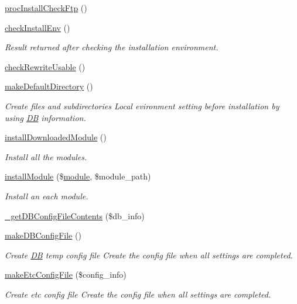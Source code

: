 \begin{DoxyCompactItemize}
\hyperlink{classinstallController_aebbed72d5e11663013b1c1cbe281fcfe}{proc\+Install\+Check\+Ftp} ()
\item 
\hyperlink{classinstallController_a6cd48bffa15badc616c0b860c59d410e}{check\+Install\+Env} ()
\begin{DoxyCompactList}\small\item\em Result returned after checking the installation environment. \end{DoxyCompactList}\item 
\hyperlink{classinstallController_ae621886c36c43926d81f6beb56cfde25}{check\+Rewrite\+Usable} ()
\item 
\hyperlink{classinstallController_a5503f7ef0615cbd6b11a6ef4ae13c2c9}{make\+Default\+Directory} ()
\begin{DoxyCompactList}\small\item\em Create files and subdirectories Local evironment setting before installation by using \hyperlink{classDB}{D\+B} information. \end{DoxyCompactList}\item 
\hyperlink{classinstallController_ad7919cd4745794ee4f57db53e8105190}{install\+Downloaded\+Module} ()
\begin{DoxyCompactList}\small\item\em Install all the modules. \end{DoxyCompactList}\item 
\hyperlink{classinstallController_a97c582da1e115f0db5256f02d22efc88}{install\+Module} (\$\hyperlink{classmodule}{module}, \$module\+\_\+path)
\begin{DoxyCompactList}\small\item\em Install an each module. \end{DoxyCompactList}\item 
\hyperlink{classinstallController_a49b453dda367ff1ce7ef2455974f36a5}{\+\_\+get\+D\+B\+Config\+File\+Contents} (\$db\+\_\+info)
\item 
\hyperlink{classinstallController_a65277eeb03f9762ae58dab7570e5310c}{make\+D\+B\+Config\+File} ()
\begin{DoxyCompactList}\small\item\em Create \hyperlink{classDB}{D\+B} temp config file Create the config file when all settings are completed. \end{DoxyCompactList}\item 
\hyperlink{classinstallController_a87b331e263614e15c5366284648f6ee0}{make\+Etc\+Config\+File} (\$config\+\_\+info)
\begin{DoxyCompactList}\small\item\em Create etc config file Create the config file when all settings are completed. \end{DoxyCompactList}\item 

\end{DoxyCompactItemize}
